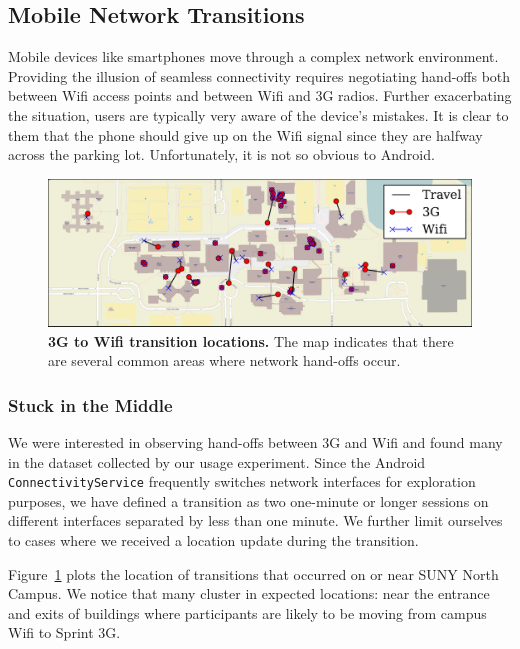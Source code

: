 \subsection{Mobile Network Transitions}
\label{subsec-networktransitions}

Mobile devices like smartphones move through a complex network environment.
Providing the illusion of seamless connectivity requires negotiating hand-offs
both between Wifi access points and between Wifi and 3G radios. Further
exacerbating the situation, users are typically very aware of the device's
mistakes. It is clear to them that the phone should give up on the Wifi
signal since they are halfway across the parking lot. Unfortunately, it is
not so obvious to Android.

\begin{figure}[t]
\includegraphics[width=\textwidth]{./figures/networking/transition_locations/graph.pdf}
\caption{\textbf{3G to Wifi transition locations.} The map indicates that
there are several common areas where network hand-offs occur.}
\label{figure-networktransitions}
\end{figure}

\subsubsection{Stuck in the Middle}

We were interested in observing hand-offs between 3G and Wifi and found many
in the dataset collected by our usage experiment. Since the Android
\texttt{ConnectivityService} frequently switches network interfaces for
exploration purposes, we have defined a transition as two one-minute or
longer sessions on different interfaces separated by less than one minute. We
further limit ourselves to cases where we received a location update during
the transition.

Figure~\ref{figure-networktransitions} plots the location of transitions that
occurred on or near SUNY North Campus. We notice that many cluster in
expected locations: near the entrance and exits of buildings where
participants are likely to be moving from campus Wifi to Sprint 3G.

